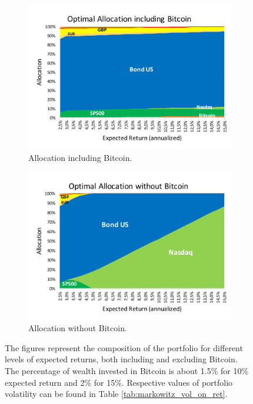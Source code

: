 \begin{figure}
	\centering
\begin{subfigure}{0.8\textwidth}
	\includegraphics[width=\linewidth]{Images/markowitz_allocation}
	\caption{Allocation including Bitcoin.}
\end{subfigure}

\begin{subfigure}{0.8\textwidth}
	\centering
	\includegraphics[width=\linewidth]{Images/markowitz_allocation_no_btc}
	\caption{Allocation without Bitcoin.}
\end{subfigure}
\caption[Markowitz Optimal Allocations]{The figures represent the composition of the portfolio for different levels of expected returns, both including and excluding Bitcoin.  The percentage of wealth invested in Bitcoin is about 1.5\%  for  10\% expected return and  2\% for 15\%. Respective values of portfolio volatility can be found in Table \ref{tab:markowitz_vol_on_ret}.}
\label{fig:markowitz_allocation}
\end{figure}





